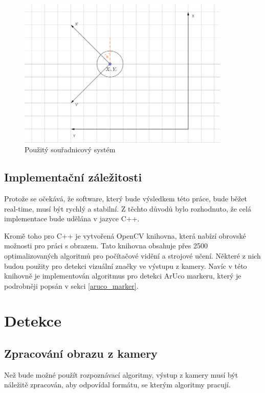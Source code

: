 \documentclass[twoside]{ctuthesis}
\theoremstyle{plain}
\theoremstyle{definition}
\theoremstyle{note}
\begin{document}
\begin{figure}[H]
	\caption{Použitý souřadnicový systém}
	
	\label{ss}
	\includegraphics[width=0.9\textwidth]{images/2/ss.png}
\end{figure}

\section{Implementační záležitosti}

Protože se očekává, že software, který bude výsledkem této práce, bude běžet real-time, musí být rychlý a stabilní. Z těchto důvodů bylo rozhodnuto, že celá implementace bude udělána v jazyce C++.

Kromě toho pro C++ je vytvořená OpenCV knihovna, která nabízí obrovské možnosti pro práci s obrazem. Tato knihovna obsahuje přes 2500 optimalizovaných algoritmů pro počítačové vidění a strojové učení. Některé z nich budou použity pro detekci vizuální značky ve výstupu z kamery. Navíc v této knihovně je implementován algoritmus pro detekci ArUco markeru, který je podrobněji popsán v sekci \ref{aruco_marker}.

\chapter{Detekce}

\section{Zpracování obrazu z kamery}

Než bude možné použít rozpoznávací algoritmy, výstup z kamery musí být náležitě zpracován, aby odpovídal formátu, se kterým algoritmy pracují.
\end{document}

